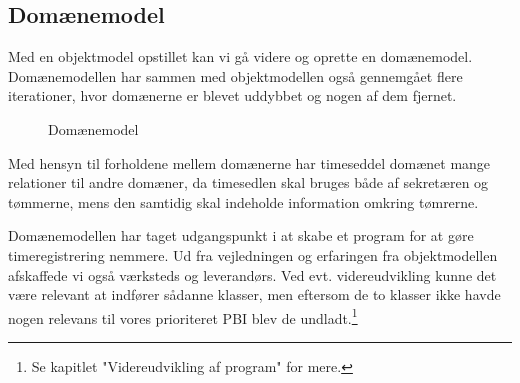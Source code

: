 \subsection{Domænemodel}

Med en objektmodel opstillet kan vi gå videre og oprette en domænemodel.
Domænemodellen har sammen med objektmodellen også gennemgået flere iterationer, hvor domænerne er blevet uddybbet og nogen af dem fjernet.

\begin{figure}[H]
    \caption{Domænemodel}
    \label{fig:DomaeneModelSprint2}
\end{figure} 

Med hensyn til forholdene mellem domænerne har timeseddel domænet mange relationer til andre domæner, da timesedlen skal bruges både af sekretæren og tømmerne, mens den samtidig skal indeholde information omkring tømrerne.

Domænemodellen har taget udgangspunkt i at skabe et program for at gøre timeregistrering nemmere. Ud fra vejledningen og erfaringen fra objektmodellen afskaffede vi også værksteds og leverandørs. Ved evt. videreudvikling kunne det være relevant at indfører sådanne klasser, men eftersom de to klasser ikke havde nogen relevans til vores prioriteret PBI blev de undladt.\footnote{Se kapitlet "Videreudvikling af program" for mere.}